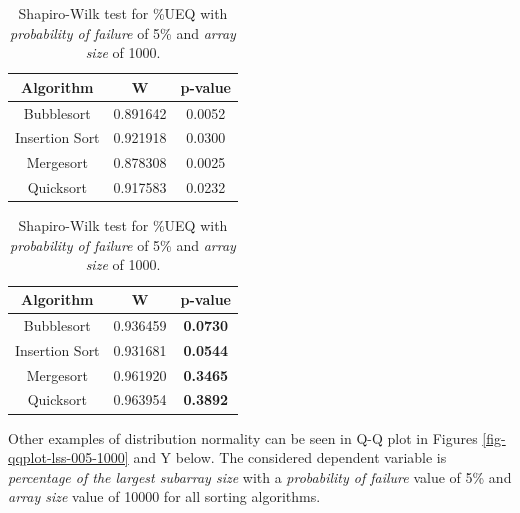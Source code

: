 \begin{table}[H]
    \parbox{.45\linewidth}{
        \caption{Shapiro-Wilk test for \%LSS with \textit{probability of failure} of 5\% and \textit{array size} of 1000.}
        \begin{center}
        \begin{tabular}{|c|c|c|}
        \hline
        \textbf{Algorithm} & \textbf{W} & \textbf{p-value} \\
        \hline
        Bubblesort & 0.891642 & 0.0052 \\
        \hline
        Insertion Sort & 0.921918 & 0.0300 \\
        \hline
        Mergesort & 0.878308 & 0.0025 \\
        \hline
        Quicksort & 0.917583 & 0.0232 \\
        \hline
        \end{tabular}
        \label{table-shapiro-test-lss-005-1000}
        \end{center}
    }
    \hfill
    \parbox{.45\linewidth}{
        \caption{Shapiro-Wilk test for \%UEQ with \textit{probability of failure} of 5\% and \textit{array size} of 1000.}
        \begin{center}
        \begin{tabular}{|c|c|c|}
        \hline
        \textbf{Algorithm} & \textbf{W} & \textbf{p-value} \\
        \hline
        Bubblesort & 0.936459 & \textbf{0.0730} \\
        \hline
        Insertion Sort & 0.931681 & \textbf{0.0544} \\
        \hline
        Mergesort & 0.961920 & \textbf{0.3465} \\
        \hline
        Quicksort & 0.963954 & \textbf{0.3892} \\
        \hline
        \end{tabular}
        \label{table-shapiro-test-ueq-005-1000}
        \end{center}
    }
\end{table}

Other examples of distribution normality can be seen in Q-Q plot in Figures \ref{fig-qqplot-lss-005-1000} and Y below. The considered dependent variable is \textit{percentage of the largest subarray size} with a \textit{probability of failure} value of 5\% and \textit{array size} value of 10000 for all sorting algorithms.


